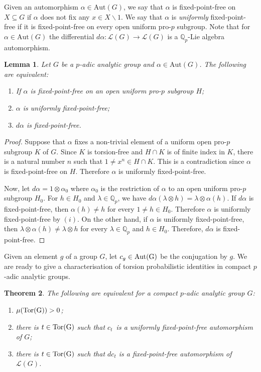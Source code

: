 \documentclass[a4paper,10pt]{amsart}
\theoremstyle{plain}
\newtheorem{thm}{Theorem}[section]
\newtheorem{lemma}[thm]{Lemma}
\theoremstyle{definition}
\newcommand{\bbQ}{\mathbb{Q}}
\numberwithin{equation}{section}
\begin{document}
Given an automorphism $\alpha\in\mathrm{Aut}(G)$, we say that $\alpha$ is fixed-point-free on $X\subseteq G$ if $\alpha$ does not fix any $x\in X\smallsetminus{1}$. We say that $\alpha$ is \emph{uniformly} fixed-point-free if it is fixed-point-free on every open uniform pro-$p$ subgroup. Note that for $\alpha\in\mathrm{Aut}(G)$ the differential $d\alpha\colon \mathcal{L}(G)\to\mathcal{L}(G)$ is a $\bbQ_p$-Lie algebra automorphism.
\begin{lemma}\label{ufpf}
Let $G$ be a $p$-adic analytic group and $\alpha\in\mathrm{Aut}(G)$. The following are equivalent:
\begin{enumerate}
\item[(i)] If $\alpha$ is fixed-point-free on an open uniform pro-$p$ subgroup $H$;
\item[(ii)] $\alpha$ is uniformly fixed-point-free;
\item[(iii)] $d\alpha$ is fixed-point-free.
\end{enumerate}
\end{lemma}
\begin{proof}
Suppose that $\alpha$ fixes a non-trivial element of a uniform open pro-$p$ subgroup $K$ of $G$. Since $K$ is torsion-free and $H\cap K$ is of finite index in $K$, there is a natural number $n$ such that $1\neq x^n\in H\cap K$. This is a contradiction since $\alpha$ is fixed-point-free on $H$. Therefore $\alpha$ is uniformly fixed-point-free.


Now, let $d\alpha=1\otimes\alpha_0$ where $\alpha_0$ is the restriction of $\alpha$ to an open uniform pro-$p$ subgroup $H_0$. For $h\in H_0$ and $\lambda\in \bbQ_p$, we have $d\alpha(\lambda\otimes h)=\lambda\otimes \alpha(h)$. If $d\alpha$ is fixed-point-free, then $\alpha(h)\neq h$ for every $1\neq h\in H_0$. Therefore $\alpha$ is uniformly fixed-point-free by $(i)$. On the other hand, if $\alpha$ is uniformly fixed-point-free, then $\lambda\otimes\alpha(h)\neq \lambda\otimes h$ for every $\lambda\in\bbQ_p$ and $h\in H_0$. Therefore, $d\alpha$ is fixed-point-free.
\end{proof}
Given an element $g$ of a group $G$, let $c_g\in\rm{Aut}(G)$ be the conjugation by $g$. We are ready to give a characterisation of torsion probabilistic identities in compact $p$-adic analytic groups.
\begin{thm}\label{torsionpadic}
The following are equivalent for a compact $p$-adic analytic group $G$:
\begin{enumerate}
\item[(i)] $\mu(\rm{Tor}(G))>0$;
\item[(ii)] there is $t\in\rm{Tor}(G)$ such that $c_t$\ is a uniformly fixed-point-free automorphism of $G$;
\item[(iii)] there is $ t\in \rm{Tor}(G)$ such that $dc_t$ is a fixed-point-free automorphism of $\mathcal{L}(G)$.
\end{enumerate}
\end{thm}
\end{document}
